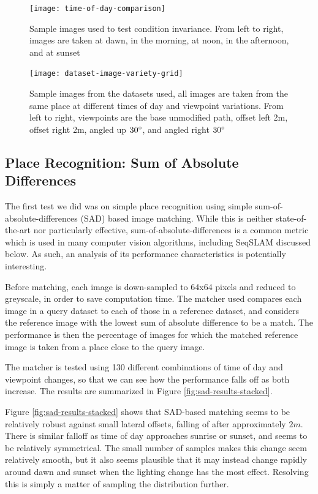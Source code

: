 \documentclass[letterpaper, 10 pt, conference]{ieeeconf}  %
\begin{document}
\begin{figure}[t]
    \texttt{[image: time-of-day-comparison]}
    \caption{Sample images used to test condition invariance. From left to right, images are taken at dawn, in the morning, at noon, in the afternoon, and at sunset}
    \label{fig:dataset-time-of-day-example}
\end{figure}

\begin{figure}[t]
    \texttt{[image: dataset-image-variety-grid]}
    \caption{Sample images from the datasets used, all images are taken from the same place at different times of day and viewpoint variations. From left to right, viewpoints are the base unmodified path, offset left 2m, offset right 2m, angled up $30\degree$, and angled right $30\degree$}
    \label{fig:dataset-example}
\end{figure}

\subsection{Place Recognition: Sum of Absolute Differences}

The first test we did was on simple place recognition using simple sum-of-absolute-differences (SAD) based image matching. While this is neither state-of-the-art nor particularly effective, sum-of-absolute-differences is a common metric which is used in many computer vision algorithms, including SeqSLAM discussed below. As such, an analysis of its performance characteristics is potentially interesting.

Before matching, each image is down-sampled to 64x64 pixels and reduced to greyscale, in order to save computation time. The matcher used compares each image in a query dataset to each of those in a reference dataset, and considers the reference image with the lowest sum of absolute difference to be a match. The performance is then the percentage of images for which the matched reference image is taken from a place close to the query image.

The matcher is tested using 130 different combinations of time of day and viewpoint changes, so that we can see how the performance falls off as both increase. The results are summarized in Figure \ref{fig:sad-results-stacked}.

Figure \ref{fig:sad-results-stacked} shows that SAD-based matching seems to be relatively robust against small lateral offsets, falling of after approximately $2m$. There is similar falloff as time of day approaches sunrise or sunset, and seems to be relatively symmetrical. The small number of samples makes this change seem relatively smooth, but it also seems plausible that it may instead change rapidly around dawn and sunset when the lighting change has the most effect. Resolving this is simply a matter of sampling the distribution further.
\end{document}
